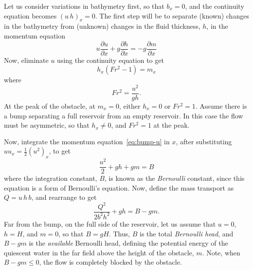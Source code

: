 \documentclass[11pt]{report}
\numberwithin{equation}{section}
\begin{document}
Let us consider variations in bathymetry first, so that $b_x = 0$, and the continuity equation becomes $(u\,h)_x = 0$.  The first step will be to separate (known) changes in the bathymetry from (unknown) changes in the fluid thickness, $h$, in the momentum equation
\begin{equation}
    \label{eq:bump-u}
    u \frac{\partial u}{\partial x} + g \frac{\partial h}{\partial x} = - g \frac{\partial m}{\partial x}
\end{equation}
Now, eliminate $u$ using the continuity equation to get
\begin{equation}
    h_x (Fr^2 - 1) = m_x 
\end{equation}
where
\begin{equation}
Fr^2 = \frac{u^2}{g h}.
\end{equation}
At the peak of the obstacle, at $m_x = 0$, either $h_x = 0$ or $Fr^2 = 1$.  Assume there is a bump separating a full reservoir from an empty reservoir.  In this case the flow must be asymmetric, so that $h_x \ne 0$, and $Fr^2 = 1$ at the peak.

Now, integrate the momentum equation~\ref{eq:bump-u} in $x$, after substituting $u u_x = \frac{1}{2}(u^2)_x$, to get
\begin{equation}
    \frac{u^2}{2} + g h + g m = B
\end{equation}
where the integration constant, $B$, is known as the \emph{Bernoulli} constant, since this equation is a form of Bernoulli's equation.  Now, define the mass transport as $Q=u\,h\,b$, and rearrange to get
\begin{equation}
    \label{eq:bernoulli-dim}
    \frac{Q^2}{2 b^2 h^2} + g h = B - g m.
\end{equation}
Far from the bump, on the full side of the reservoir, let us assume that $u=0$, $h=H$, and $m=0$, so that $B = g H$.  Thus, $B$ is the total \emph{Bernoulli head}, and $B-gm$ is the \emph{available} Bernoulli head, defining the potential energy of the quiescent water in the far field above the height of the obstacle, $m$.  Note, when $B - gm \le 0$, the flow is completely blocked by the obstacle.
\end{document}
